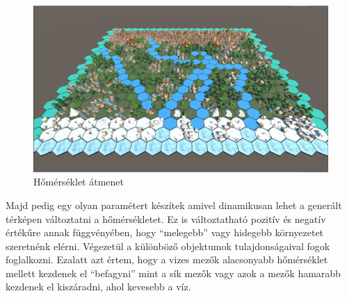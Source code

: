 \begin{figure}[h!]
\centering
\includegraphics[scale=0.5]{kepek/transition.png}
\caption{Hőmérséklet átmenet}
\label{fig:transition}
\end{figure}

\noindent Majd pedig egy olyan paramétert készítek amivel dinamikusan lehet a generált térképen változtatni a hőmérsékletet. Ez is változtatható pozitív és negatív értékűre annak függvényében, hogy “melegebb” vagy hidegebb környezetet szeretnénk elérni.
\newline
\newline Végezetül a különböző objektumok tulajdonságaival fogok foglalkozni. Ezalatt azt értem, hogy a vizes mezők alacsonyabb hőmérséklet mellett kezdenek el “befagyni” mint a sík mezők vagy azok a mezők hamarabb kezdenek el kiszáradni, ahol kevesebb a víz.

